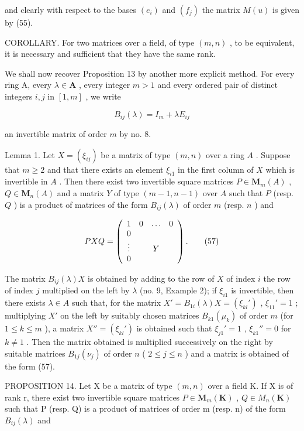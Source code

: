 and clearly with respect to the bases \((e_{i})\) and \((f_{j})\) the matrix \(M(u)\) is given by (55).

COROLLARY. For two matrices over a field, of type \((m, n)\) , to be equivalent, it is necessary and sufficient that they have the same rank.

We shall now recover Proposition 13 by another more explicit method. For every ring A, every \(\lambda \in \mathbf{A}\) , every integer \(m > 1\) and every ordered pair of distinct integers \(i, j\) in \([1, m]\) , we write

\[
B _ {i j} (\lambda) = I _ {m} + \lambda E _ {i j}\tag{56}
\]

an invertible matrix of order \(m\) by no. 8.

Lemma 1. Let \(X = (\xi_{ij})\) be a matrix of type \((m, n)\) over a ring \(A\) . Suppose that \(m \geqslant 2\) and that there exists an element \(\xi_{i1}\) in the first column of \(X\) which is invertible in \(A\) . Then there exist two invertible square matrices \(P \in \mathbf{M}_m(A)\) , \(Q \in \mathbf{M}_n(A)\) and a matrix \(Y\) of type \((m - 1, n - 1)\) over \(A\) such that \(P\) (resp. \(Q\) ) is a product of matrices of the form \(B_{ij}(\lambda)\) of order \(m\) (resp. \(n\) ) and

\[
P X Q = \left( \begin{array}{c c c c} 1 & 0 & \ldots & 0 \\ 0 & & \\ \vdots & & Y \\ 0 & & \end{array} \right).\tag{57}
\]

The matrix \(B_{ij}(\lambda)X\) is obtained by adding to the row of \(X\) of index \(i\) the row of index \(j\) multiplied on the left by \(\lambda\) (no. 9, Example 2); if \(\xi_{i1}\) is invertible, then there exists \(\lambda \in A\) such that, for the matrix \(X' = B_{1i}(\lambda)X = (\xi_{kl}')\) , \(\xi_{11}' = 1\) ; multiplying \(X'\) on the left by suitably chosen matrices \(B_{k1}(\mu_k)\) of order \(m\) (for \(1 \leqslant k \leqslant m\) ), a matrix \(X'' = (\xi_{kl}')\) is obtained such that \(\xi_{j1}' = 1\) , \(\xi_{k1}'' = 0\) for \(k \neq 1\) . Then the matrix obtained is multiplied successively on the right by suitable matrices \(B_{1j}(\nu_j)\) of order \(n\) ( \(2 \leqslant j \leqslant n\) ) and a matrix is obtained of the form (57).

PROPOSITION 14. Let X be a matrix of type \((m, n)\) over a field K. If X is of rank r, there exist two invertible square matrices \(P \in \mathbf{M}_{m}(\mathbf{K})\) , \(Q \in M_{n}(\mathbf{K})\) such that P (resp. Q) is a product of matrices of order m (resp. n) of the form \(B_{ij}(\lambda)\) and

